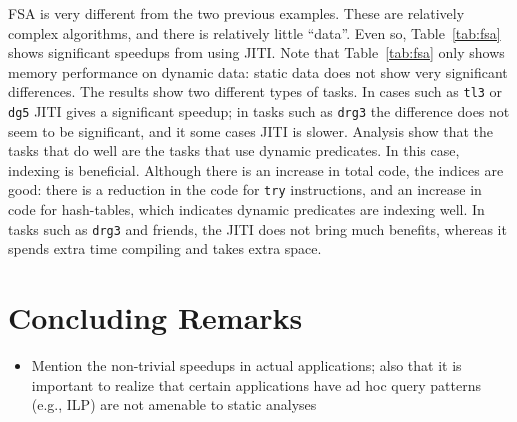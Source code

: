 \documentclass{llncs}
\begin{document}
FSA is very different from the two previous examples. These are
relatively complex algorithms, and there is relatively little
``data''. Even so, Table~\ref{tab:fsa} shows significant speedups from
using JITI. Note that Table~\ref{tab:fsa} only shows memory
performance on dynamic data: static data does not show very
significant differences.  The results show two different types of
tasks. In cases such as \texttt{tl3} or \texttt{dg5} JITI gives a
significant speedup; in tasks such as \texttt{drg3} the difference
does not seem to be significant, and it some cases JITI is slower.
Analysis show that the tasks that do well are the tasks that use
dynamic predicates. In this case, indexing is beneficial. Although
there is an increase in total code, the indices are good: there is a
reduction in the code for \texttt{try} instructions, and an increase
in code for hash-tables, which indicates dynamic predicates are
indexing well. In tasks such as \texttt{drg3} and friends, the JITI
does not bring much benefits, whereas it spends extra time compiling
and takes extra space.


\section{Concluding Remarks}
\begin{itemize}
\item Mention the non-trivial speedups in actual applications; also
  that it is important to realize that certain applications have ad
  hoc query patterns (e.g., ILP) are not amenable to static analyses
\end{itemize}



\end{document}
